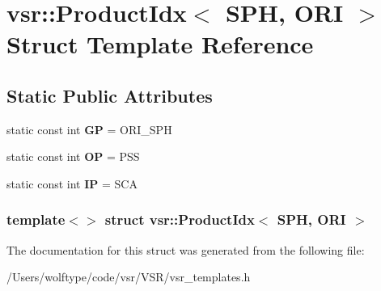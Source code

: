 \hypertarget{structvsr_1_1_product_idx_3_01_s_p_h_00_01_o_r_i_01_4}{\section{vsr\-:\-:Product\-Idx$<$ S\-P\-H, O\-R\-I $>$ Struct Template Reference}
\label{structvsr_1_1_product_idx_3_01_s_p_h_00_01_o_r_i_01_4}
}
\subsection*{Static Public Attributes}
\begin{DoxyCompactItemize}
\item 
\hypertarget{structvsr_1_1_product_idx_3_01_s_p_h_00_01_o_r_i_01_4_af704ba9ed297b2f0f5b80b914805e995}{static const int {\bfseries G\-P} = O\-R\-I\-\_\-\-S\-P\-H}\label{structvsr_1_1_product_idx_3_01_s_p_h_00_01_o_r_i_01_4_af704ba9ed297b2f0f5b80b914805e995}

\item 
\hypertarget{structvsr_1_1_product_idx_3_01_s_p_h_00_01_o_r_i_01_4_a6dcfce2d138ece1610afbcde3836e5b0}{static const int {\bfseries O\-P} = P\-S\-S}\label{structvsr_1_1_product_idx_3_01_s_p_h_00_01_o_r_i_01_4_a6dcfce2d138ece1610afbcde3836e5b0}

\item 
\hypertarget{structvsr_1_1_product_idx_3_01_s_p_h_00_01_o_r_i_01_4_ae69a83128f5047bb6f0bec95f4d8d86c}{static const int {\bfseries I\-P} = S\-C\-A}\label{structvsr_1_1_product_idx_3_01_s_p_h_00_01_o_r_i_01_4_ae69a83128f5047bb6f0bec95f4d8d86c}

\end{DoxyCompactItemize}
\subsubsection*{template$<$$>$ struct vsr\-::\-Product\-Idx$<$ S\-P\-H, O\-R\-I $>$}



The documentation for this struct was generated from the following file\-:\begin{DoxyCompactItemize}
\item 
/\-Users/wolftype/code/vsr/\-V\-S\-R/vsr\-\_\-templates.\-h\end{DoxyCompactItemize}
